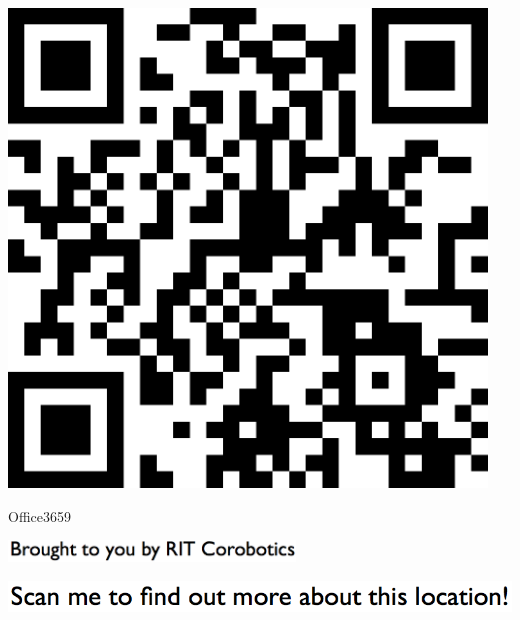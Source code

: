 \documentclass[letterpaper]{article}
\begin{document}
 \begingroup 
 \centerline{\includegraphics[scale=1,width=5in,height=5in]{Office3659.png}} 
 \endgroup 
 \vspace*{\fill} 

 \hfill{\small Office3659} 

  \vspace{0.7in} 
 
 \centerline{\includegraphics[scale=1,width=3in]{text-bottom.png}} 
 
 \pagebreak 
{} 
 \vspace*{\fill} 
 
  \centerline{\includegraphics[scale=1,width=6in]{text-top.png}} 
 
 \vspace{0.5in} 
 
\end{document}

